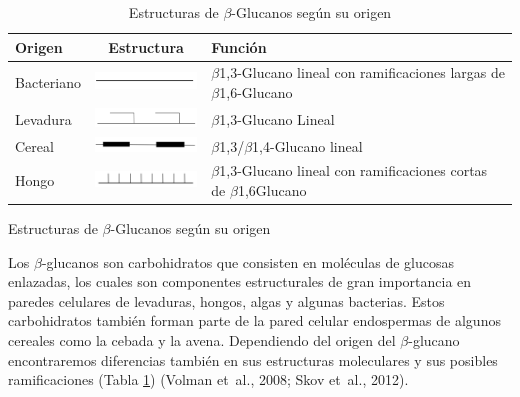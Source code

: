 \documentclass[12pt,letterpaper,oneside]{scrbook}
\begin{document}
\begin{table}[h!]
    \sffamily
    \begin{center}
        \begin{threeparttable}
            \caption{Estructuras de $\beta$-Glucanos según su origen}\label{tablaglucanos}
            \begin{tabularx}{13cm}{l c X}
                \toprule
                \textbf{Origen} & \textbf{Estructura} & \textbf{Función} \\
                \midrule
                Bacteriano & \includegraphics[width=3cm]{bgbacteriano} & $\beta$1,3-Glucano lineal con ramificaciones largas de $\beta$1,6-Glucano\\
                Levadura & \includegraphics[width=3cm]{bglevadura} & $\beta$1,3-Glucano Lineal \\ 
                Cereal & \includegraphics[width=3cm]{bgcereal} & $\beta$1,3/$\beta$1,4-Glucano lineal \\
                Hongo & \includegraphics[width=3cm]{bghongo} & $\beta$1,3-Glucano lineal con ramificaciones cortas de $\beta$1,6Glucano \\
                \bottomrule
            \end{tabularx}
            \begin{tablenotes}
                \item Estructuras de $\beta$-Glucanos según su origen
            \end{tablenotes}
        \end{threeparttable}
    \end{center}
\end{table}

Los \(\beta\)-glucanos son carbohidratos que consisten en moléculas de
glucosas enlazadas, los cuales son componentes estructurales de gran
importancia en paredes celulares de levaduras, hongos, algas y algunas
bacterias. Estos carbohidratos también forman parte de la pared celular
endospermas de algunos cereales como la cebada y la avena. Dependiendo
del origen del \(\beta\)-glucano encontraremos diferencias también en
sus estructuras moleculares y sus posibles ramificaciones (Tabla
\ref{tablaglucanos}) (Volman et~al., 2008; Skov et~al., 2012).
\end{document}

